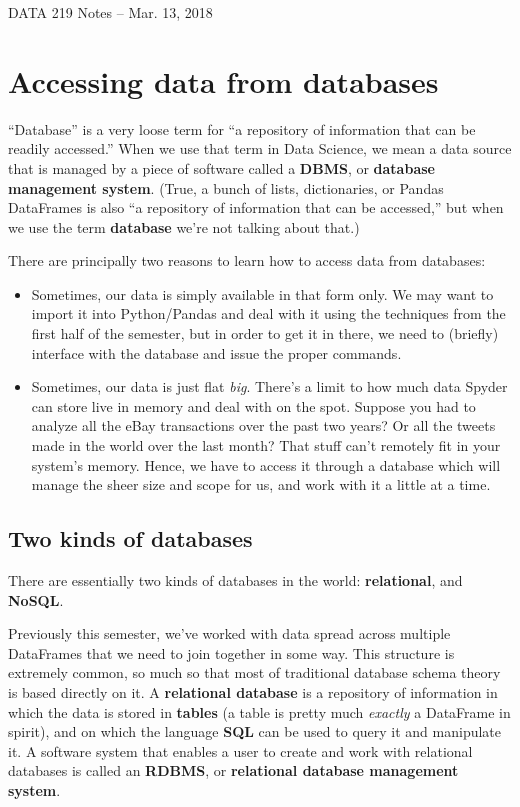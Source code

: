 \documentclass[12pt]{article}
\begin{document}
\begin{center}
\begin{Large}
DATA 219 Notes -- Mar. 13, 2018
\end{Large}
\end{center}

\section{Accessing data from databases}

``Database'' is a very loose term for ``a repository of information that can
be readily accessed.'' When we use that term in Data Science, we mean a data
source that is managed by a piece of software called a \textbf{DBMS}, or
\textbf{database management system}. (True, a bunch of lists, dictionaries, or
Pandas DataFrames is also ``a repository of information that can be
accessed,''
but when we use the term \textbf{database} we're not talking about that.)

There are principally two reasons to learn how to access data from databases:

\begin{itemize}
\itemsep.1em
\item Sometimes, our data is simply available in that form only. We may want
to import it into Python/Pandas and deal with it using the techniques from the
first half of the semester, but in order to get it in there, we need to
(briefly) interface with the database and issue the proper commands.
\item Sometimes, our data is just flat \textit{big}. There's a limit to how
much data Spyder can store live in memory and deal with on the spot. Suppose
you had to analyze all the eBay transactions over the past two years? Or all
the tweets made in the world over the last month? That stuff can't remotely
fit in your system's memory. Hence, we have to access it through a database
which will manage the sheer size and scope for us, and work with it a little
at a time.
\end{itemize}

\subsection{Two kinds of databases}

There are essentially two kinds of databases in the world:
\textbf{relational}, and \textbf{NoSQL}.

Previously this semester, we've worked with data spread across multiple
DataFrames that we need to join together in some way. This structure is
extremely common, so much so that most of traditional database schema theory
is based directly on it. A \textbf{relational database} is a repository of
information in which the data is stored in \textbf{tables} (a table is pretty
much \textit{exactly} a DataFrame in spirit), and on which the language
\textbf{SQL} can be used to query it and manipulate it. A software system that
enables a user to create and work with relational databases is called an
\textbf{RDBMS}, or \textbf{relational database management system}.
\end{document}
